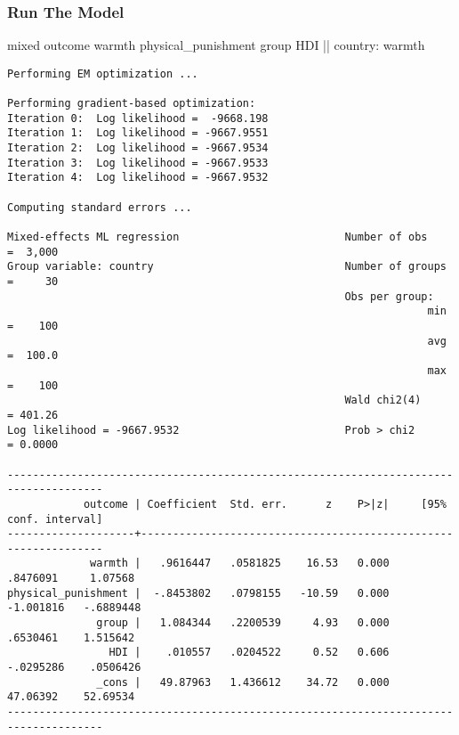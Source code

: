 \documentclass[
  letterpaper,
  DIV=11,
  numbers=noendperiod]{scrreprt}
\newenvironment{Shaded}{\begin{snugshade}}{\end{snugshade}}
\newcommand{\FunctionTok}[1]{\textcolor[rgb]{0.28,0.35,0.67}{#1}}
\newcommand{\NormalTok}[1]{\textcolor[rgb]{0.00,0.23,0.31}{#1}}
\begin{document}
\subsubsection{Run The Model}\label{run-the-model}

\begin{Shaded}
\begin{Highlighting}[]

\NormalTok{mixed outcome warmth physical\_punishment }\FunctionTok{group}\NormalTok{ HDI || country: warmth}
\end{Highlighting}
\end{Shaded}

\begin{verbatim}
Performing EM optimization ...

Performing gradient-based optimization: 
Iteration 0:  Log likelihood =  -9668.198  
Iteration 1:  Log likelihood = -9667.9551  
Iteration 2:  Log likelihood = -9667.9534  
Iteration 3:  Log likelihood = -9667.9533  
Iteration 4:  Log likelihood = -9667.9532  

Computing standard errors ...

Mixed-effects ML regression                          Number of obs    =  3,000
Group variable: country                              Number of groups =     30
                                                     Obs per group:
                                                                  min =    100
                                                                  avg =  100.0
                                                                  max =    100
                                                     Wald chi2(4)     = 401.26
Log likelihood = -9667.9532                          Prob > chi2      = 0.0000

-------------------------------------------------------------------------------------
            outcome | Coefficient  Std. err.      z    P>|z|     [95% conf. interval]
--------------------+----------------------------------------------------------------
             warmth |   .9616447   .0581825    16.53   0.000     .8476091     1.07568
physical_punishment |  -.8453802   .0798155   -10.59   0.000    -1.001816   -.6889448
              group |   1.084344   .2200539     4.93   0.000     .6530461    1.515642
                HDI |    .010557   .0204522     0.52   0.606    -.0295286    .0506426
              _cons |   49.87963   1.436612    34.72   0.000     47.06392    52.69534
-------------------------------------------------------------------------------------


\end{verbatim}
\end{document}
